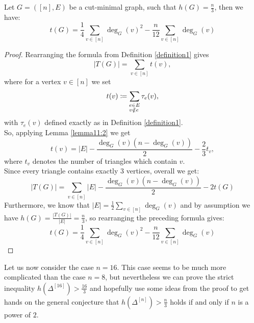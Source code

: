 \begin{lem}\label{lemma363}
Let \(G=([n],E)\) be a cut-minimal graph, such that \(h(G)=\frac{n}{3}\), then we have:
\[
t(G)=\frac{1}{4}\sum\limits_{v\in [n]}\deg_G(v)^2-\frac{n}{12}\sum\limits_{v\in [n]}\deg_G(v)
\]
\begin{proof}
Rearranging the formula from Definition \ref{definition1} gives
\[
|T(G)|=\sum\limits_{v\in [n]}t(v),
\]
where for a vertex \(v\in [n]\) we set
\[
t(v)\coloneqq\sum\limits_{\begin{subarray}{l}e\in E \\ v\notin e\end{subarray}}\tau_e(v),
\]
with \(\tau_e(v)\) defined exactly as in Definition \ref{definition1}.\\
So, applying Lemma \ref{lemma11:2} we get
\[
t(v)=|E|-\frac{\deg_G(v)(n-\deg_G(v))}{2}-\frac{2}{3}t_v,
\]
where \(t_v\) denotes the number of triangles which contain \(v\).\\
Since every triangle contains exactly \(3\) vertices, overall we get:
\[
|T(G)|=\sum\limits_{v\in [n]}|E|-\frac{\deg_G(v)(n-\deg_G(v))}{2}-2t(G)
\]
Furthermore, we know that \(|E|=\frac{1}{2}\sum\limits_{v\in [n]}\deg_G(v)\) and by assumption we have \(h(G)=\frac{|T(G)|}{|E|}=\frac{n}{3}\), so rearranging the preceding formula gives:
\[
t(G)=\frac{1}{4}\sum\limits_{v\in [n]}\deg_G(v)^2-\frac{n}{12}\sum\limits_{v\in [n]}\deg_G(v)
\]
\end{proof}
\end{lem}

Let us now consider the case \(n=16\). This case seems to be much more complicated than the case \(n=8\), but nevertheless we can prove the strict inequality \(h(\Delta^{[16]})>\frac{16}{3}\) and hopefully use some ideas from the proof to get hands on the general conjecture that \(h(\Delta^{[n]})>\frac{n}{3}\) holds if and only if \(n\) is a power of \(2\).

